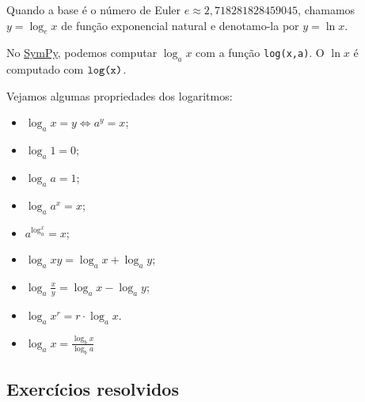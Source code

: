 \begin{obs}
  Quando a base é o número de Euler $e \approx 2,718281828459045$, chamamos $y = \log_e x$ de função exponencial natural e denotamo-la por $y = \ln x$.

  \ifispython
  No \href{https://www.sympy.org}{SymPy}, podemos computar $\log_a x$ com a função \verb+log(x,a)+. O $\ln x$ é computado com $\verb+log(x)+$.
  \fi
\end{obs}

\begin{obs}
  Vejamos algumas propriedades dos logaritmos:
  \begin{itemize}
  \item $\displaystyle \log_a x = y \Leftrightarrow a^y = x$;
  \item $\displaystyle \log_a 1 = 0$;
  \item $\displaystyle \log_a a = 1$;
  \item $\displaystyle \log_a a^x = x$;
  \item $\displaystyle a^{\log_a^x} = x$;
  \item $\displaystyle \log_a xy = \log_a x + \log_a y$;
  \item $\displaystyle \log_a \frac{x}{y} = \log_a x - \log_a y$;
  \item $\displaystyle \log_a x^r = r\cdot\log_a x$.
  \item $\displaystyle \log_a x = \frac{\log_b x}{\log_b a}$
  \end{itemize}
\end{obs}

\subsection*{Exercícios resolvidos}

